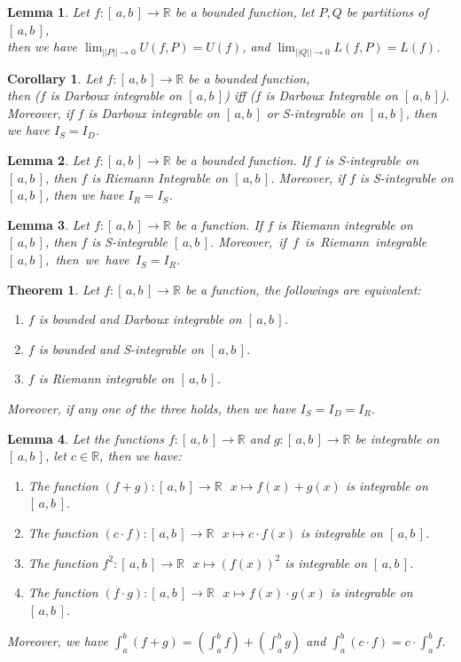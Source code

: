 \documentclass[11pt]{article}
\theoremstyle{break}
\theoremstyle{break}
\newtheorem{thm}{Theorem}[section]
\newtheorem{lem}{Lemma}[thm]
\newtheorem{corL}{Corollary}[lem]
\newcommand{\R}{\mathbb{R}}
\newcommand{\Intab}{[\,a,b\,]}
\begin{document}
	\begin{lem}
		Let $f:\Intab \to \R$ be a bounded function, let $P,Q$ be partitions of $\Intab$,\\ then we have $\lim_{||P|| \to 0} U(f,P) = U(f)$, and $\lim_{||Q|| \to 0} L(f,P) = L(f)$.
	\end{lem}
	
	\begin{corL}
		Let $f:\Intab \to \R$ be a bounded function,\\ then ($f$ is Darboux integrable on $\Intab$) iff ($f$ is Darboux Integrable on $\Intab$).\\ Moreover, if $f$ is Darboux integrable on $\Intab$ or S-integrable on $\Intab$, then we have $I_S =I_D$.
	\end{corL}

	\begin{lem}
		Let $f:\Intab \to \R$ be a bounded function. If $f$ is S-integrable on $\Intab$, then $f$ is Riemann Integrable on $\Intab$. Moreover, if $f$ is S-integrable on $\Intab$, then we have $I_R=I_S$.
	\end{lem}
	
	\begin{lem}
		Let $f:\Intab \to \R$ be a function. If $f$ is Riemann integrable on $\Intab$, then $f$ is S-integrable $\Intab$. \mbox{Moreover, if $f$ is Riemann integrable $\Intab$, then we have $I_S=I_R$}.
	\end{lem}
	
	\begin{thm}
		Let $f:\Intab \to \R$ be a function, the followings are equivalent:
		\begin{enumerate}[topsep=3pt,itemsep=-1ex,partopsep=1ex,parsep=1ex]
		\item $f$ is bounded and Darboux integrable on $\Intab$.
		\item $f$ is bounded and S-integrable on $\Intab$.
		\item $f$ is Riemann integrable on $\Intab$.
		\end{enumerate}
		Moreover, if any one of the three holds, then we have $I_S = I_D = I_R$.
	\end{thm}
	
	\begin{lem}
		Let the functions $f:\Intab \to \R$ and $g:\Intab \to \R$ be integrable on $\Intab$, let $c \in \R$, then we have:
		\begin{enumerate}[topsep=3pt,itemsep=-1ex,partopsep=1ex,parsep=1ex]
			\item The function $(f+g):\Intab \to \R \ \ \ x \mapsto f(x)+g(x)$ is integrable on $\Intab$.
			\item The function $(c \cdot f):\Intab \to \R \ \ \ x \mapsto c \cdot f(x)$ is integrable on $\Intab$.
			\item The function $f^2:\Intab \to \R \ \ \ x \mapsto (f(x))^2$ is integrable on $\Intab$.
			\item The function $(f \cdot g):\Intab \to \R \ \ \ x \mapsto f(x) \cdot g(x)$ is integrable on $\Intab$.
		\end{enumerate}
		Moreover, we have $\int_a^b (f+g) = (\int_a^b f )+ (\int_a^b g)$ and $\int_a^b (c \cdot f) = c \cdot \int_a^b f$.
	\end{lem}
	
\end{document}
